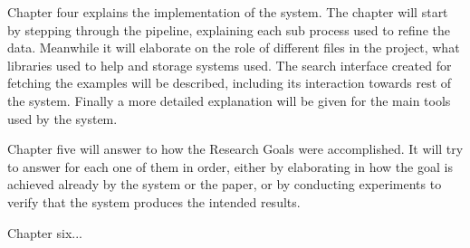 Chapter four explains the implementation of the system. The chapter will start by stepping through the pipeline, explaining each sub process used to refine the data. Meanwhile it will elaborate on the role of different files in the project, what libraries used to help and storage systems used. The search interface created for fetching the examples will be described, including its interaction towards rest of the system. Finally a more detailed explanation will be given for the main tools used by the system.

Chapter five will answer to how the Research Goals were accomplished. It will try to answer for each one of them in order, either by elaborating in how the goal is achieved already by the system or the paper, or by conducting experiments to verify that the system produces the intended results.

Chapter six...


\cleardoublepage